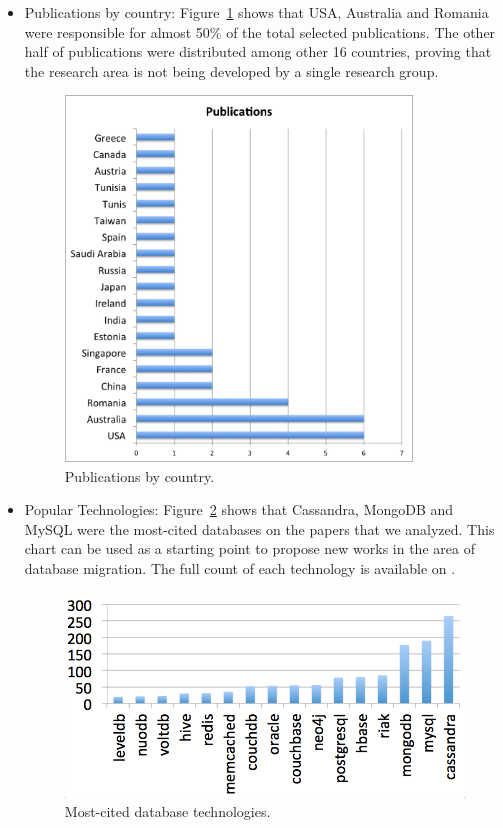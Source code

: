 \documentclass[conference, 10pt, a4paper]{IEEEtran}
\begin{document}
\begin{itemize}
\item{Publications by country: }
Figure~\ref{fig:pubVsCountry} shows that USA, Australia and Romania were responsible for almost 50\% of the total selected publications. The other half of publications were distributed among other 16 countries, proving that the research area is not being developed by a single research group. 
\begin{figure}[htb!]
\centering
\includegraphics[width=92mm]{graph3.png}
\caption{Publications by country. \label{fig:pubVsCountry}}
\end{figure}



\item{Popular Technologies: }
Figure~\ref{fig:mostCitedDB} shows that Cassandra, MongoDB and MySQL were the most-cited databases on the papers that we analyzed. This chart can be used as a starting point to propose new works in the area of database migration. The full count of each technology is available on \cite{fullDBJson}.
\begin{figure}%
\centering
\includegraphics[width=120mm]{db-graph.png}
\caption{Most-cited database technologies. \label{fig:mostCitedDB}}
\end{figure}


\end{itemize}
\end{document}
